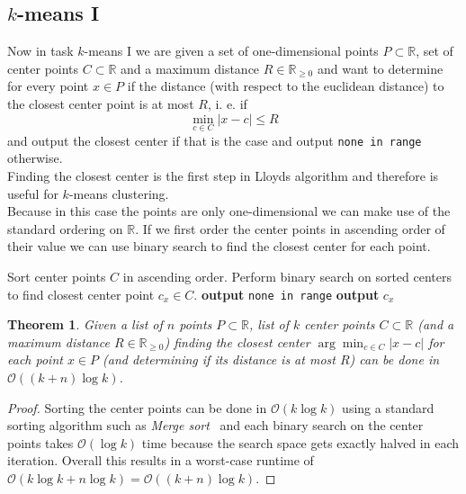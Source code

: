 \documentclass[a4paper,12pt,headsepline]{scrartcl}
\newtheorem{theorem}{Theorem}
\begin{document}
    \subsection{$k$-means I}\label{sec:km1}
    Now in task $k$-means I we are given a set of one-dimensional points $P \subset \mathbb R$,
    set of center points $C \subset \mathbb R$ and a maximum distance $R \in \mathbb{R}_{\geq 0}$
    and want to determine for every point $x \in P$ if the distance (with respect to the 
    euclidean distance) to the closest center point is at most $R$, i. e.
    if 
    \[
        \min_{c \in C} \lvert x - c \rvert \leq R
    \]
    and output the closest center if that is the case and output \texttt{none in range} 
    otherwise.\\
    Finding the closest center is the first step in Lloyds algorithm and therefore 
    is useful for $k$-means clustering.\\
    Because in this case the points are only one-dimensional we can make use of the standard ordering
    on $\mathbb R$. If we first order the center points in ascending order of their value
    we can use binary search to find the closest center for each point.
    \begin{algorithm}[H]
    \caption{closest center in 1d}
    \begin{algorithmic}[1]
        \State Sort center points $C$ in ascending order.
            \State Perform binary search on sorted centers to find closest center point $c_x \in C$.
                \State \textbf{output} \texttt{none in range}
            \Else
                \State \textbf{output} $c_x$
            \EndIf
        \EndFor
    \end{algorithmic}
    \label{alg:cc1}
    \end{algorithm}
    \begin{theorem}
        Given a list of $n$ points $P \subset \mathbb R$, list of $k$ center
        points $C \subset \mathbb R$ (and a maximum distance $R \in \mathbb R_{\geq 0}$)
        finding the closest center $\arg\min_{c \in C} |x - c|$ for each point $x \in P$
        (and determining if its distance is at most $R$) can be done in $\mathcal O((k+n)\log k)$.
    \end{theorem}
    \begin{proof}
        Sorting the center points can be done in $\mathcal O(k\log k)$ using a standard 
        sorting algorithm such as \textit{Merge sort}~\citep{Knuth1998} and each binary search 
        on the center points takes $\mathcal O(\log k)$ time because the search space
        gets exactly halved in each iteration. Overall this results in a worst-case 
        runtime of $\mathcal O(k\log k + n\log k) = \mathcal O((k+n)\log k)$.
    \end{proof}
\end{document}
